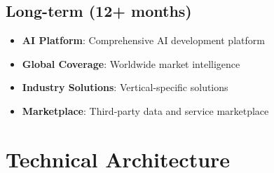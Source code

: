 \documentclass[business]{../templates/infraradar-main}
\begin{document}
\subsection{Long-term (12+ months)}
\begin{itemize}
    \item \textbf{AI Platform}: Comprehensive AI development platform
    \item \textbf{Global Coverage}: Worldwide market intelligence
    \item \textbf{Industry Solutions}: Vertical-specific solutions
    \item \textbf{Marketplace}: Third-party data and service marketplace
\end{itemize}

\section{Technical Architecture}
\end{document}
